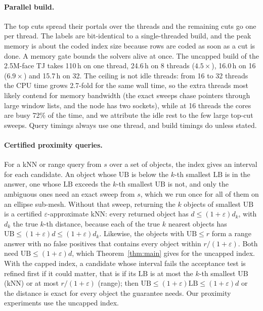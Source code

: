 \documentclass[sigconf,nonacm,screen]{acmart}
\newcommand{\LB}{\mathrm{LB}}
\newcommand{\UB}{\mathrm{UB}}
\newcommand{\eps}{\varepsilon}
\begin{document}
\paragraph{Parallel build.}
The top cuts spread their portals over the threads and the remaining cuts go one per thread. The labels are
bit-identical to a single-threaded build, and the peak memory is about the coded index size because rows are coded as
soon as a cut is done. A memory gate bounds the solvers alive at once. The uncapped build of the 2.5M-face TJ takes
110\,h on one thread, 24.6\,h on 8 threads ($4.5\times$), 16.0\,h on 16 ($6.9\times$) and 15.7\,h on 32. The ceiling is
not idle threads: from 16 to 32 threads the CPU time grows 2.7-fold for the same wall time, so the extra threads
most likely contend for memory bandwidth (the exact sweeps chase pointers through large window lists, and the node has two
sockets), while at 16 threads the cores are busy 72\% of the time, and we attribute the idle rest to the few large top-cut
sweeps. Query
timings always use one thread, and build timings do unless stated.

\paragraph{Certified proximity queries.}
For a kNN or range query from $s$ over a set of objects, the index gives an interval for each candidate. An
object whose $\UB$ is below the $k$-th smallest $\LB$ is in the answer, one whose $\LB$ exceeds the $k$-th
smallest $\UB$ is not, and only the ambiguous ones need an exact sweep from $s$, which we run once for all of
them on an ellipse sub-mesh. Without that sweep, returning the $k$ objects of smallest $\UB$ is a certified
$\eps$-approximate kNN: every returned object has $d\le(1+\eps)d_k$, with $d_k$ the true $k$-th distance, because
each of the true $k$ nearest objects has $\UB\le(1+\eps)d\le(1+\eps)d_k$. Likewise, the objects with $\UB\le r$ form
a range answer with no false positives that contains every object within $r/(1+\eps)$. Both need
$\UB\le(1+\eps)d$, which Theorem~\ref{thm:main} gives for the uncapped index. With the capped index, a candidate
whose interval fails the acceptance test is refined first if it could matter, that is if its $\LB$ is at most the
$k$-th smallest $\UB$ (kNN) or at most $r/(1+\eps)$ (range); then $\UB\le(1+\eps)\LB\le(1+\eps)d$ or the distance
is exact for every object the guarantee needs. Our proximity experiments use the uncapped index.
\end{document}
